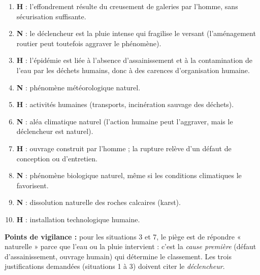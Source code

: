 \documentclass[11pt]{article}
\begin{document}
\begin{corrige}
\begin{enumerate}
\item \textbf{H} : l'effondrement résulte du creusement de galeries par l'homme, sans sécurisation suffisante.
\item \textbf{N} : le déclencheur est la pluie intense qui fragilise le versant (l'aménagement routier peut toutefois aggraver le phénomène).
\item \textbf{H} : l'épidémie est liée à l'absence d'assainissement et à la contamination de l'eau par les déchets humains, donc à des carences d'organisation humaine.
\item \textbf{N} : phénomène météorologique naturel.
\item \textbf{H} : activités humaines (transports, incinération sauvage des déchets).
\item \textbf{N} : aléa climatique naturel (l'action humaine peut l'aggraver, mais le déclencheur est naturel).
\item \textbf{H} : ouvrage construit par l'homme ; la rupture relève d'un défaut de conception ou d'entretien.
\item \textbf{N} : phénomène biologique naturel, même si les conditions climatiques le favorisent.
\item \textbf{N} : dissolution naturelle des roches calcaires (karst).
\item \textbf{H} : installation technologique humaine.
\end{enumerate}
\textbf{Points de vigilance :} pour les situations 3 et 7, le piège est de répondre « naturelle » parce que l'eau ou la pluie intervient : c'est la \emph{cause première} (défaut d'assainissement, ouvrage humain) qui détermine le classement. Les trois justifications demandées (situations 1 à 3) doivent citer le \emph{déclencheur}.
\end{corrige}
\end{document}
